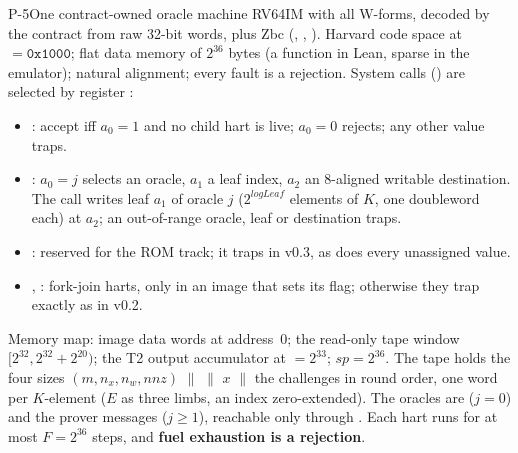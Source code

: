 \begin{decision}{P-5}{One contract-owned oracle machine}
RV64IM with all W-forms, decoded by the contract from raw 32-bit words, plus Zbc (,
, ). Harvard code space at ${}=\mathtt{0x1000}$; flat
data memory of $2^{36}$ bytes (a function in Lean, sparse in the emulator); natural alignment;
every fault is a rejection. System calls () are selected by register :
\begin{itemize}[nosep]
\item {}: accept iff $a_0=1$ and no child hart is live; $a_0=0$ rejects; any other value
  traps.
\item {}: $a_0=j$ selects an oracle, $a_1$ a leaf index, $a_2$ an 8-aligned writable
  destination. The call writes leaf $a_1$ of oracle $j$ ($2^{\mathit{logLeaf}}$ elements of $K$,
  one doubleword each) at $a_2$; an out-of-range oracle, leaf or destination traps.
\item {}: reserved for the ROM track; it traps in v0.3, as does every unassigned value.
\item {}, : fork-join harts, only in an image that sets its 
  flag; otherwise they trap exactly as in v0.2.
\end{itemize}
Memory map: image data words at address~0; the read-only tape window
$[2^{32},2^{32}+2^{20})$; the T2 output accumulator at ${}=2^{33}$;
$\mathit{sp}=2^{36}$. The tape holds the four sizes $(m,n_x,n_w,\mathit{nnz})$ $\|$ 
$\|$ $x$ $\|$ the challenges in round order, one word per $K$-element ($E$ as three limbs, an index
zero-extended). The oracles are  ($j=0$) and the prover messages ($j\ge1$), reachable
only through . Each hart runs for at most $F=2^{36}$ steps, and \textbf{fuel exhaustion
is a rejection}.
\end{decision}


